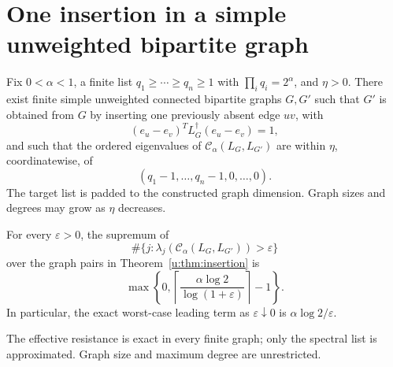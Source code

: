 \section{One insertion in a simple unweighted bipartite graph}\label{u:sec:unweighted}
\begin{theorem}
\label{u:thm:insertion}
Fix $0<\alpha<1$, a finite list $q_1\ge\cdots\ge q_n\ge1$
with $\prod_iq_i=2^\alpha$, and $\eta>0$.
There exist finite simple unweighted connected bipartite graphs $G,G'$
such that $G'$ is obtained from $G$ by inserting one previously absent
edge $uv$, with
\[
 (e_u-e_v)^T L_G^\dagger(e_u-e_v)=1,
\]
and such that the ordered eigenvalues of $\mathcal C_\alpha(L_G,L_{G'})$ are
within $\eta$, coordinatewise, of
\[
 (q_1-1,\ldots,q_n-1,0,\ldots,0).
\]
The target list is padded to the constructed graph dimension.
Graph sizes and degrees may grow as $\eta$ decreases.
\end{theorem}

\begin{corollary}
\label{u:cor:count}
For every $\varepsilon>0$, the supremum of
\[
 \#\{j:\lambda_j(\mathcal C_\alpha(L_G,L_{G'}))>\varepsilon\}
\]
over the graph pairs in Theorem~\ref{u:thm:insertion} is
\[
 \max\left\{0,\left\lceil
      \frac{\alpha\log2}{\log(1+\varepsilon)}
                         \right\rceil-1\right\}.
\]
In particular, the exact worst-case leading term as
$\varepsilon\downarrow0$ is $\alpha\log2/\varepsilon$.
\end{corollary}


The effective resistance is exact in every finite graph; only the spectral list
is approximated. Graph size and maximum degree are unrestricted.

